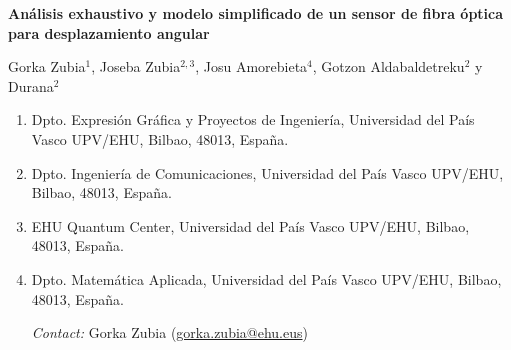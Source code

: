 \documentclass[11pt,a4paper]{article}
\begin{document}
    \begin{center}
        \fontsize{16}{19}\selectfont\bfseries
        Análisis exhaustivo y modelo simplificado de un sensor de fibra óptica para desplazamiento angular
\end{center}

\vspace{1em}
\begin{center}
\fontsize{11}{13}\selectfont
Gorka Zubia$^{1}$, \; Joseba Zubia$^{2,3}$, \; Josu Amorebieta$^{4}$, \; Gotzon Aldabaldetreku$^{2}$ y Durana$^{2}$
\end{center}

\begin{enumerate}[leftmargin=0.5cm, rightmargin=0.5cm, label=\arabic*., itemsep=0pt, parsep=4pt]
\item Dpto. Expresión Gráfica y Proyectos de Ingeniería, Universidad del País Vasco UPV/EHU, Bilbao, 48013, España.
\item Dpto. Ingeniería de Comunicaciones, Universidad del País Vasco UPV/EHU, Bilbao, 48013, España.
\item EHU Quantum Center, Universidad del País Vasco UPV/EHU, Bilbao, 48013, España.
\item Dpto. Matemática Aplicada, Universidad del País Vasco UPV/EHU, Bilbao, 48013, España.
\begin{center}
    \vspace{-0.5cm}\textit{Contact:} Gorka Zubia (\href{mailto:gorka.zubia@ehu.eus}{gorka.zubia@ehu.eus})
\end{center}
\end{enumerate}
\end{document}
